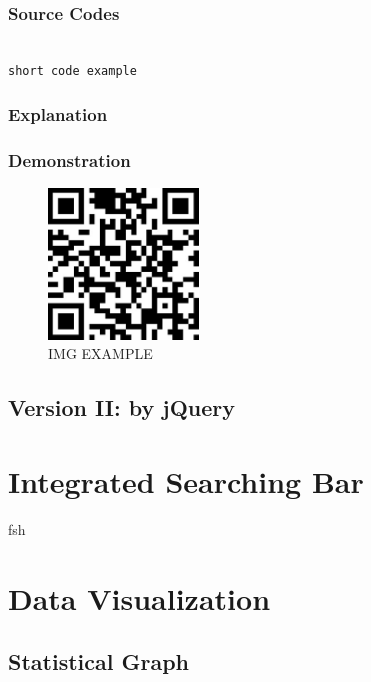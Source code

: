 \documentclass{book}
\begin{document}
\subsection{Source Codes}

\begin{minipage}[r]{15em}
\begin{verbatim}

short code example

\end{verbatim}
\end{minipage}

\subsection{Explanation}

\subsection{Demonstration}

\begin{figure}[H]
\centering
\includegraphics[height=4.0cm,width=4.0cm]{img/dsw_1.jpg}
\caption{IMG EXAMPLE}
\end{figure}


\section{Version II: by jQuery}



\chapter {Integrated Searching Bar}

fsh


\chapter {Data Visualization}


\section {Statistical Graph}
\end{document}
